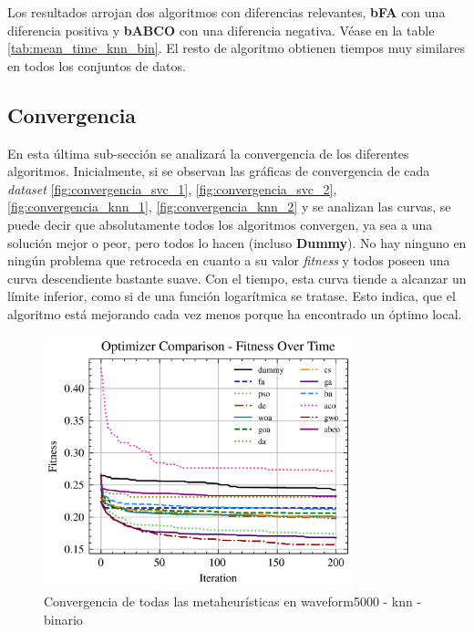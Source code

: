 Los resultados arrojan dos algoritmos con diferencias relevantes, \textbf{bFA} con una diferencia positiva y \textbf{bABCO} con una diferencia negativa. Véase en la table \ref{tab:mean_time_knn_bin}. El resto de algoritmo obtienen tiempos muy similares en todos los conjuntos de datos.

\subsection{Convergencia}
En esta última sub-sección se analizará la convergencia de los diferentes algoritmos. Inicialmente, si se observan las gráficas de convergencia de cada \textit{dataset} \ref{fig:convergencia_svc_1}, \ref{fig:convergencia_svc_2}, \ref{fig:convergencia_knn_1}, \ref{fig:convergencia_knn_2} y se analizan las curvas, se puede decir que absolutamente todos los algoritmos convergen, ya sea a una solución mejor o peor, pero todos lo hacen (incluso \textbf{Dummy}). No hay ninguno en ningún problema que retroceda en cuanto a su valor \textit{fitness} y todos poseen una curva descendiente bastante suave. Con el tiempo, esta curva tiende a alcanzar un límite inferior, como si de una función logarítmica se tratase. Esto indica, que el algoritmo está mejorando cada vez menos porque ha encontrado un óptimo local.

\begin{figure}[htp]
    \includegraphics[width=0.8\textwidth]{imagenes/fitness_charts/img/binary/waveform5000/optimizers_fitness_knn.png}
    \caption{Convergencia de todas las metaheurísticas en waveform5000 - knn - binario}
\end{figure}

